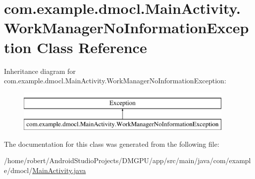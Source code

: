 \hypertarget{classcom_1_1example_1_1dmocl_1_1MainActivity_1_1WorkManagerNoInformationException}{}\section{com.\+example.\+dmocl.\+Main\+Activity.\+Work\+Manager\+No\+Information\+Exception Class Reference}
\label{classcom_1_1example_1_1dmocl_1_1MainActivity_1_1WorkManagerNoInformationException}
Inheritance diagram for com.\+example.\+dmocl.\+Main\+Activity.\+Work\+Manager\+No\+Information\+Exception\+:\begin{figure}[H]
\begin{center}
\leavevmode
\includegraphics[height=2.000000cm]{classcom_1_1example_1_1dmocl_1_1MainActivity_1_1WorkManagerNoInformationException}
\end{center}
\end{figure}


The documentation for this class was generated from the following file\+:\begin{DoxyCompactItemize}
\item 
/home/robert/\+Android\+Studio\+Projects/\+D\+M\+G\+P\+U/app/src/main/java/com/example/dmocl/\mbox{\hyperlink{MainActivity_8java}{Main\+Activity.\+java}}\end{DoxyCompactItemize}
